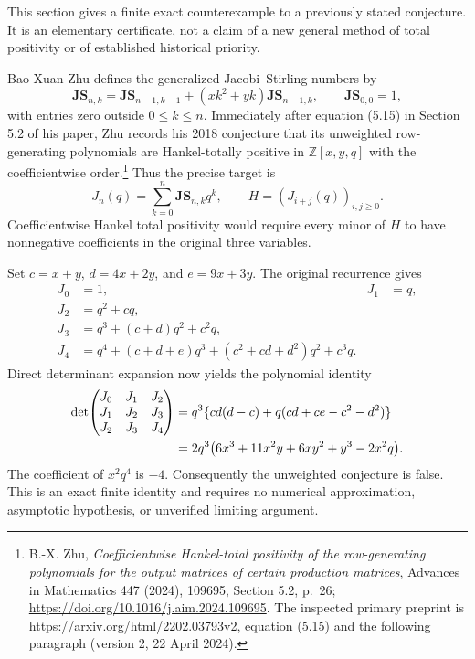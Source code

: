\documentclass[11pt,a4paper]{article}
\numberwithin{equation}{section}
\begin{document}
This section gives a finite exact counterexample to a previously stated
conjecture.  It is an elementary certificate, not a claim of a new general
method of total positivity or of established historical priority.

Bao-Xuan Zhu defines the generalized Jacobi--Stirling numbers by
\begin{equation}\label{eq:js-original-recurrence}
 \mathbf{JS}_{n,k}=\mathbf{JS}_{n-1,k-1}
 +(xk^2+yk)\mathbf{JS}_{n-1,k},
 \qquad \mathbf{JS}_{0,0}=1,
\end{equation}
with entries zero outside $0\leq k\leq n$.  Immediately after equation
(5.15) in Section 5.2 of his paper, Zhu records his 2018 conjecture that
its unweighted row-generating polynomials are Hankel-totally positive in
$\mathbb Z[x,y,q]$ with the coefficientwise order.\footnote{B.-X. Zhu,
\emph{Coefficientwise Hankel-total positivity of the row-generating
polynomials for the output matrices of certain production matrices},
Advances in Mathematics 447 (2024), 109695, Section 5.2, p.~26;
\url{https://doi.org/10.1016/j.aim.2024.109695}.
The inspected primary preprint is
\url{https://arxiv.org/html/2202.03793v2}, equation (5.15) and the
following paragraph (version 2, 22 April 2024).}
Thus the precise target is
\[
 J_n(q)=\sum_{k=0}^n\mathbf{JS}_{n,k}q^k,
 \qquad H=(J_{i+j}(q))_{i,j\geq0}.
\]
Coefficientwise Hankel total positivity would require every minor of
$H$ to have nonnegative coefficients in the original three variables.

Set $c=x+y$, $d=4x+2y$, and $e=9x+3y$.  The original recurrence gives
\begin{align*}
 J_0&=1, &J_1&=q,\\
 J_2&=q^2+cq,\\
 J_3&=q^3+(c+d)q^2+c^2q,\\
 J_4&=q^4+(c+d+e)q^3+(c^2+cd+d^2)q^2+c^3q.
\end{align*}
Direct determinant expansion now yields the polynomial identity
\begin{align}
 \det\!\begin{pmatrix}J_0&J_1&J_2\\J_1&J_2&J_3\\J_2&J_3&J_4\end{pmatrix}
 &=q^3\{cd(d-c)+q(cd+ce-c^2-d^2)\}\notag\\
 &=2q^3\bigl(6x^3+11x^2y+6xy^2+y^3-2x^2q\bigr).
 \label{eq:js-negative-minor}
\end{align}
The coefficient of $x^2q^4$ is $-4$.  Consequently the unweighted
conjecture is false.  This is an exact finite identity and requires no
numerical approximation, asymptotic hypothesis, or unverified limiting
argument.
\end{document}
